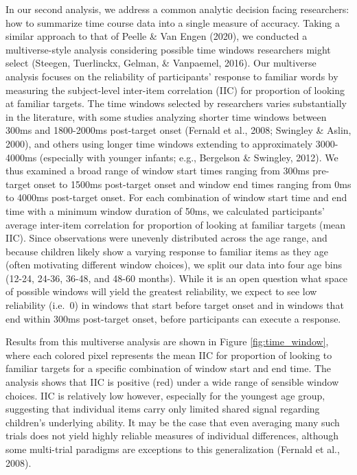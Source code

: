 \documentclass[10pt, letterpaper]{article}
\begin{document}
In our second analysis, we address a common analytic decision facing
researchers: how to summarize time course data into a single measure of
accuracy. Taking a similar approach to that of Peelle \& Van Engen
(2020), we conducted a multiverse-style analysis considering possible
time windows researchers might select (Steegen, Tuerlinckx, Gelman, \&
Vanpaemel, 2016). Our multiverse analysis focuses on the reliability of
participants' response to familiar words by measuring the subject-level
inter-item correlation (IIC) for proportion of looking at familiar
targets. The time windows selected by researchers varies substantially
in the literature, with some studies analyzing shorter time windows
between 300ms and 1800-2000ms post-target onset (Fernald et al., 2008;
Swingley \& Aslin, 2000), and others using longer time windows extending
to approximately 3000-4000ms (especially with younger infants; e.g.,
Bergelson \& Swingley, 2012). We thus examined a broad range of window
start times ranging from 300ms pre-target onset to 1500ms post-target
onset and window end times ranging from 0ms to 4000ms post-target onset.
For each combination of window start time and end time with a minimum
window duration of 50ms, we calculated participants' average inter-item
correlation for proportion of looking at familiar targets (mean IIC).
Since observations were unevenly distributed across the age range, and
because children likely show a varying response to familiar items as
they age (often motivating different window choices), we split our data
into four age bins (12-24, 24-36, 36-48, and 48-60 months). While it is
an open question what space of possible windows will yield the greatest
reliability, we expect to see low reliability (i.e.~0) in windows that
start before target onset and in windows that end within 300ms
post-target onset, before participants can execute a response.

Results from this multiverse analysis are shown in Figure
\ref{fig:time_window}, where each colored pixel represents the mean IIC
for proportion of looking to familiar targets for a specific combination
of window start and end time. The analysis shows that IIC is positive
(red) under a wide range of sensible window choices. IIC is relatively
low however, especially for the youngest age group, suggesting that
individual items carry only limited shared signal regarding children's
underlying ability. It may be the case that even averaging many such
trials does not yield highly reliable measures of individual
differences, although some multi-trial paradigms are exceptions to this
generalization (Fernald et al., 2008).
\end{document}
